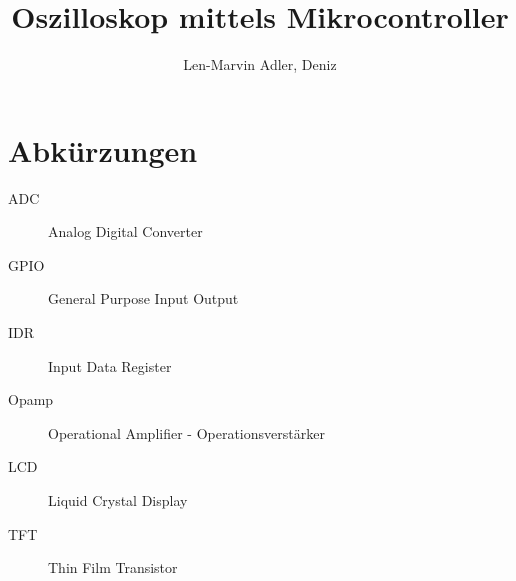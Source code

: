 \documentclass[]{article}
\title{Oszilloskop mittels Mikrocontroller}
\author{Len-Marvin Adler, Deniz}
\begin{document}
\maketitle
\thispagestyle{empty}
\clearpage
\tableofcontents
\thispagestyle{empty}
\clearpage

\setcounter{page}{3}
\section*{Abkürzungen}
\begin{description}
	\item[ADC]
	Analog Digital Converter
	
	\item[GPIO]
	General Purpose Input Output

	\item[IDR]
	Input Data Register
	
	\item[Opamp]
	Operational Amplifier - Operationsverstärker

	\item[LCD]
	Liquid Crystal Display

	\item[TFT]
	Thin Film Transistor
\end{description}
\clearpage

\setcounter{page}{1}





















\end{document}
